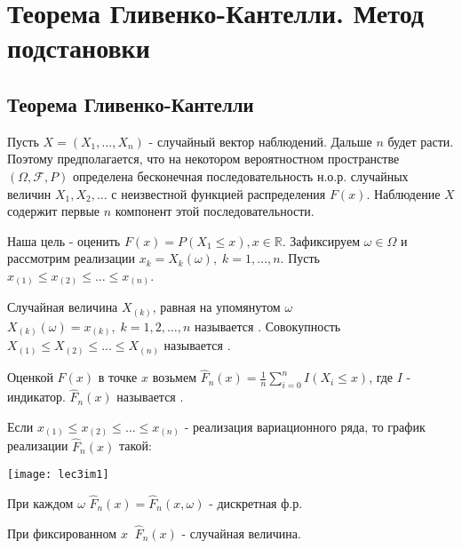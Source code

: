 
\chapter{Теорема Гливенко-Кантелли. Метод подстановки} %

\section{Теорема Гливенко-Кантелли}\label{lec:3/sec:1}

Пусть  $X=(X_1, \dots, X_n)$ - случайный вектор наблюдений. Дальше $n$ будет расти. Поэтому предполагается, что на некотором вероятностном пространстве $(\Omega, \mathcal{F}, P)$ определена бесконечная последовательность н.о.р. случайных величин $X_1, X_2, \dots$ с неизвестной функцией распределения $F(x)$. Наблюдение $X$ содержит первые $n$ компонент этой последовательности.

Наша цель - оценить $F(x) = P(X_1 \leq x), x \in \mathbb{R}$. Зафиксируем $\omega \in \Omega$ и рассмотрим реализации $\displaystyle x_k = X_k(\omega), \;k=1,\dots, n$.
Пусть $\displaystyle x_{(1)}\leq x_{(2)} \leq \dots\leq x_{(n)}$.
\begin{definition}
	Случайная величина $X_{(k)}$, равная на упомянутом $\omega$
	$\displaystyle X_{(k)}(\omega)= x_{(k)}, \;k = 1, 2, \dots, n$
	называется .
	Совокупность $\displaystyle X_{(1)}\leq X_{(2)} \leq...\leq X_{(n)}$
	называется .
\end{definition}

\begin{definition}
	Оценкой $F(x)$ в точке $x$ возьмем $\hat{F}_n(x) = \frac{1}{n}\sum\limits_{i=0}^{n}I(X_i \leq x)$, где $I$ - индикатор.
	$\hat{F}_n(x)$ называется .
\end{definition}

Если $x_{(1)}\leq x_{(2)} \leq \dots \leq x_{(n)}$ - реализация вариационного ряда, то график реализации $\hat{F}_n(x)$ такой:
\begin{multicols}{2}

	\texttt{[image: lec3im1]}

	\columnbreak
	\hfill \break

	При каждом $\omega$ $\hat{F}_n(x) =\hat{F}_n(x, \omega)$ - дискретная ф.р. 

	При фиксированном $ x \;\; \hat{F}_n(x)$ - случайная величина.
\end{multicols}

